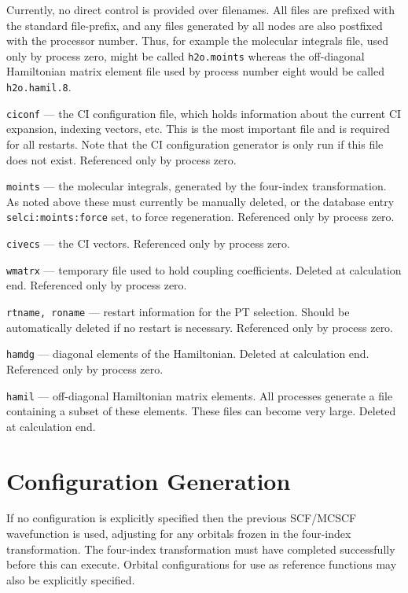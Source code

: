 Currently, no direct control is provided over filenames.  All files
are prefixed with the standard file-prefix, and any files generated by
all nodes are also postfixed with the processor number.  Thus, for
example the molecular integrals file, used only by process zero, might
be called {\tt h2o.moints} whereas the off-diagonal Hamiltonian matrix
element file used by process number eight would be called {\tt
  h2o.hamil.8}.

\sloppy

\begin{description}
\item{\tt ciconf} --- the CI configuration file, which holds
  information about the current CI expansion, indexing vectors, etc.
  This is the most important file and is required for all restarts.
  Note that the CI configuration generator is only run if this file
  does not exist. Referenced only by process zero.
\item{\tt moints} --- the molecular integrals, generated by the four-index
  transformation.  As noted above these must currently be manually
  deleted, or the database entry \verb+selci:moints:force+ set, to
  force regeneration.  Referenced only by process zero.
\item{\tt civecs} --- the CI vectors.    Referenced only by process zero.
\item{\tt wmatrx} --- temporary file used to hold coupling coefficients.
  Deleted at calculation end.  Referenced only by process zero.
\item{\tt rtname, roname} --- restart information for the PT
  selection.  Should be automatically deleted if no restart is
  necessary.  Referenced only by process zero.
\item{\tt hamdg} --- diagonal elements of the Hamiltonian.
  Deleted at calculation end.  Referenced only by process zero.
\item{\tt hamil} --- off-diagonal Hamiltonian matrix elements.  All
  processes generate a file containing a subset of these elements.
  These files can become very large.  Deleted at calculation end.
\end{description}

\fussy

\section{Configuration Generation}

If no configuration is explicitly specified then the previous
SCF/MCSCF wavefunction is used, adjusting for any orbitals frozen in
the four-index transformation.  The four-index transformation must
have completed successfully before this can execute.  Orbital
configurations for use as reference functions may also be explicitly
specified.

